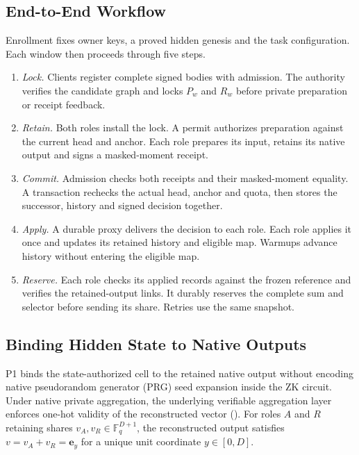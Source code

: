 \documentclass[conference,compsoc]{IEEEtran}
\theoremstyle{definition}
\numberwithin{equation}{section}
\numberwithin{table}{section}
\numberwithin{figure}{section}
\theoremstyle{plain}
\begin{document}
\subsection{End-to-End Workflow}
Enrollment fixes owner keys, a proved hidden genesis and the task configuration.
Each window then proceeds through five steps.
\begin{enumerate}
\item \emph{Lock.} Clients register complete signed bodies with admission. The
authority verifies the candidate graph and locks \(P_w\) and \(R_w\) before
private preparation or receipt feedback.
\item \emph{Retain.} Both roles install the lock. A permit authorizes preparation
against the current head and anchor. Each role prepares its input, retains its
native output and signs a masked-moment receipt.
\item \emph{Commit.} Admission checks both receipts and their masked-moment
equality. A transaction rechecks the actual head, anchor and quota, then stores
the successor, history and signed decision together.
\item \emph{Apply.} A durable proxy delivers the decision to each role. Each
role applies it once and updates its retained history and eligible map. Warmups
advance history without entering the eligible map.
\item \emph{Reserve.} Each role checks its applied records against the frozen
reference and verifies the retained-output links. It durably reserves the complete
sum and selector before sending its share. Retries use the same snapshot.
\end{enumerate}

\subsection{Binding Hidden State to Native Outputs}
\label{sec:native-adaptor}

P1 binds the state-authorized cell to the retained native output without encoding
native pseudorandom generator (PRG) seed expansion inside the ZK circuit. Under native private
aggregation, the underlying verifiable aggregation layer enforces one-hot validity of
the reconstructed vector (\cite[Section~7.4.4]{Barnes2023VDAF08}). For roles $A$ and $R$
retaining shares $v_A, v_R \in \mathbb F_q^{D+1}$, the reconstructed output satisfies
$v = v_A + v_R = \mathbf e_y$ for a unique unit coordinate $y \in [0, D]$.
\end{document}
